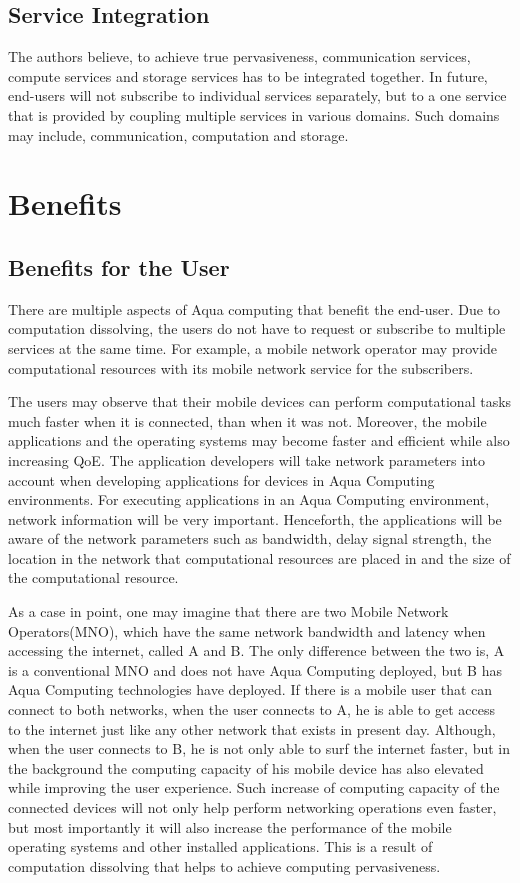 \documentclass[12pt,journal,compsoc, onecolumn]{IEEEtran}
\begin{document}
\subsection*{Service Integration}
 
The authors believe, to achieve true pervasiveness, communication services, compute services and storage services has to be integrated together. In future, end-users will not subscribe to individual services separately, but to a one service that is provided by coupling multiple services in various domains. Such domains may include, communication, computation and storage.

\section{Benefits}
\label{sec:aquabenefits}
\subsection{Benefits for the User}

There are multiple aspects of Aqua computing that benefit the end-user. Due to computation dissolving, the users do not have to request or subscribe to multiple services at the same time. For example, a mobile network operator may provide computational resources with its mobile network service for the subscribers.

The users may observe that their mobile devices can perform computational tasks much faster when it is connected, than when it was not. Moreover, the mobile applications and the operating systems may become faster and efficient while also increasing QoE. The application developers will take network parameters into account when developing applications for devices in Aqua Computing environments. For executing applications in an Aqua Computing environment, network information will be very important. Henceforth, the applications will be aware of the network parameters such as bandwidth, delay signal strength, the location in the network that computational resources are placed in and the size of the computational resource.

As a case in point, one may imagine that there are two Mobile Network Operators(MNO), which have the same network bandwidth and latency when accessing the internet, called A and B. The only difference between the two is, A is a conventional MNO and does not have Aqua Computing deployed, but B has Aqua Computing technologies have deployed. If there is a mobile user that can connect to both networks, when the user connects to A, he is able to get access to the internet just like any other network that exists in present day. Although, when the user connects to B, he is not only able to surf the internet faster, but in the background the computing capacity of his mobile device has also elevated while improving the user experience. Such increase of computing capacity of the connected devices will not only help perform networking operations even faster, but most importantly it will also increase the performance of the mobile operating systems and other installed applications. This is a result of computation dissolving that helps to achieve computing pervasiveness. 
\end{document}

